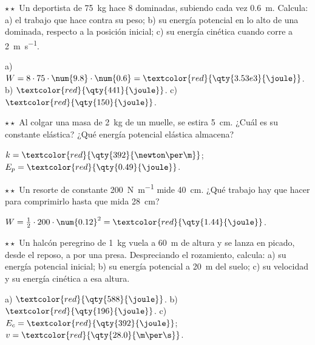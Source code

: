 \begin{exercise}
    \(\star\star\) Un deportista de \qty{75}{\kg} hace 8 dominadas, subiendo cada vez \qty{0.6}{\m}. Calcula: a) el trabajo que hace
    contra su peso; b) su energía potencial en lo alto de una dominada, respecto a la posición inicial; c) su energía cinética cuando
    corre a \qty{2}{\m\per\s}.
    \begin{solu}
        a) \(W = 8 \cdot 75 \cdot \num{9.8} \cdot \num{0.6} = \textcolor{red}{\qty{3.53e3}{\joule}}\). b) \(\textcolor{red}{\qty{441}{\joule}}\).
        c) \(\textcolor{red}{\qty{150}{\joule}}\).
    \end{solu}
\end{exercise}

\begin{exercise}
    \(\star\star\) Al colgar una masa de \qty{2}{\kg} de un muelle, se estira \qty{5}{\cm}. ¿Cuál es su constante elástica? ¿Qué energía
    potencial elástica almacena?
    \begin{solu}
        \(k = \textcolor{red}{\qty{392}{\newton\per\m}}\); \(E_p = \textcolor{red}{\qty{0.49}{\joule}}\).
    \end{solu}
\end{exercise}

\begin{exercise}
    \(\star\star\) Un resorte de constante \qty{200}{\newton\per\m} mide \qty{40}{\cm}. ¿Qué trabajo hay que hacer para comprimirlo hasta
    que mida \qty{28}{\cm}?
    \begin{solu}
        \(W = \frac{1}{2} \cdot 200 \cdot \num{0.12}^2 = \textcolor{red}{\qty{1.44}{\joule}}\).
    \end{solu}
\end{exercise}

\begin{exercise}
    \(\star\star\) Un halcón peregrino de \qty{1}{\kg} vuela a \qty{60}{\m} de altura y se lanza en picado, desde el reposo, a por una
    presa. Despreciando el rozamiento, calcula: a) su energía potencial inicial; b) su energía potencial a \qty{20}{\m} del suelo; c) su
    velocidad y su energía cinética a esa altura.
    \begin{solu}
        a) \(\textcolor{red}{\qty{588}{\joule}}\). b) \(\textcolor{red}{\qty{196}{\joule}}\). c) \(E_c = \textcolor{red}{\qty{392}{\joule}}\);
        \(v = \textcolor{red}{\qty{28.0}{\m\per\s}}\).
    \end{solu}
\end{exercise}

